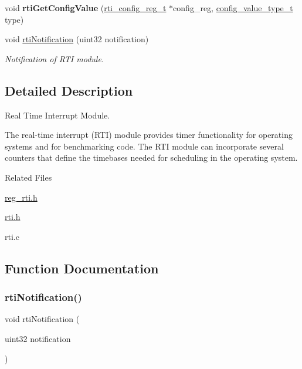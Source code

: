 \begin{DoxyCompactItemize}
void {\bfseries rti\+Get\+Config\+Value} (\mbox{\hyperlink{structrti__config__reg}{rti\+\_\+config\+\_\+reg\+\_\+t}} $\ast$config\+\_\+reg, \mbox{\hyperlink{sys__common_8h_a9daf9a5992391b058477d28d107ee5e2}{config\+\_\+value\+\_\+type\+\_\+t}} type)
\item 
void \mbox{\hyperlink{group__RTI_gaff8f87a03bb4b08ef56c289d91ff610e}{rti\+Notification}} (uint32 notification)
\begin{DoxyCompactList}\small\item\em Notification of R\+TI module. \end{DoxyCompactList}\end{DoxyCompactItemize}


\subsection{Detailed Description}
Real Time Interrupt Module. 

The real-\/time interrupt (R\+TI) module provides timer functionality for operating systems and for benchmarking code. The R\+TI module can incorporate several counters that define the timebases needed for scheduling in the operating system.

Related Files
\begin{DoxyItemize}
\item \mbox{\hyperlink{reg__rti_8h}{reg\+\_\+rti.\+h}}
\item \mbox{\hyperlink{rti_8h}{rti.\+h}}
\item rti.\+c 
\end{DoxyItemize}

\subsection{Function Documentation}
\mbox{\label{group__RTI_gaff8f87a03bb4b08ef56c289d91ff610e}} 
\subsubsection{\texorpdfstring{rti\+Notification()}{rtiNotification()}}
{\footnotesize\ttfamily void rti\+Notification (\begin{DoxyParamCaption}\item[{uint32}]{notification }\end{DoxyParamCaption})}



